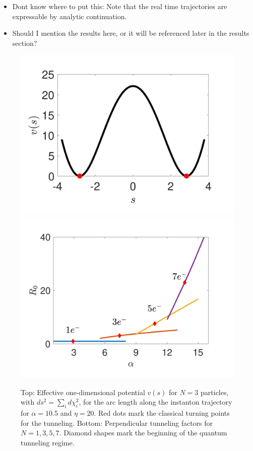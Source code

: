 \documentclass[prb,twocolumn,showpacs,preprintnumbers,amsmath,amssymb, superscriptaddress]{revtex4-2}
\newcommand{\n}{N}
\newcommand{\1}{{1\hspace*{-0.5ex} \textrm{l} \hspace*{0.5ex}}}
\begin{document}
\begin{itemize}
\item {\color{red} Dont know where to put this: Note that the real time trajectories are expressable by analytic continuation.}
\item Should I mention the results here, or it will be referenced later in the results section?
\end{itemize}
\begin{figure}[h!]
		\begin{center}
			\includegraphics[width=0.9\columnwidth]{SupMatFig_EffectivePotential.pdf}
			\includegraphics[width=0.9\columnwidth]{Fig_perpfactors.pdf}
			\caption{Top: Effective one-dimensional potential $v(s)$ for $N = 3$ particles, with $ds^2 = \sum_i d\chi_i^2$, for the arc length along the instanton trajectory for $\alpha = 10.5$ and $\eta = 20$. Red dots mark the classical turning points for the tunneling. Bottom: Perpendicular tunneling factors for $\n = 1, 3, 5, 7$. Diamond shapes mark the beginning of the quantum tunneling regime. }
						\label{fig:effpot_perpfact}		
		\end{center}
	\end{figure}
\end{document}
